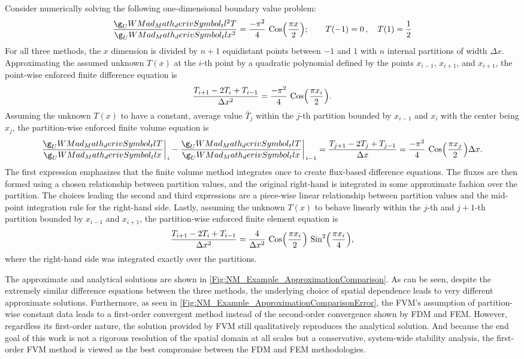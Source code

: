 \documentclass[12pt]{../UWMadThesis}
\begin{document}
Consider numerically solving the following one-dimensional boundary value problem:
\begin{equation}
    \deriv{T}{x}{2} = \frac{-\pi^2}{4}\,\Cos\left(\frac{\pi x}{2}\right);\quad\quad T(-1) = 0\,,\quad T(1) = \frac{1}{2}
    \label{Eqn:NM_Example_BVP}
\end{equation}
For all three methods, the $x$ dimension is divided by $n+1$ equidistant points between $-1$ and $1$ with $n$ internal partitions of width $\Delta{x}$.
Approximating the assumed unknown $T(x)$ at the $i$-th point by a quadratic polynomial defined by the points $x_{i-1}$, $x_{i+1}$, and $x_{i+1}$, the point-wise enforced finite difference equation is
\begin{equation}
    \frac{T_{i+1} - 2 T_i + T_{i-1}}{\Delta{x}^2} = \frac{-\pi^2}{4}\,\Cos\left(\frac{\pi x_i}{2}\right).
\end{equation}
Assuming the unknown $T(x)$ to have a constant, average value $\bar{T}_{j}$ within the $j$-th partition bounded by $x_{i-1}$ and $x_i$ with the center being $x_j$, the partition-wise enforced finite volume equation is
\begin{equation}
    \deriv{T}{x}\bigg\rvert_{i} - \deriv{T}{x}\bigg\rvert_{i-1} = 
    \frac{T_{j+1} - 2 T_j + T_{j-1}}{\Delta{x}} = \frac{-\pi^2}{4}\,\Cos\left(\frac{\pi x_j}{2}\right) \Delta{x}.
\end{equation}
The first expression emphasizes that the finite volume method integrates once to create flux-based difference equations.
The fluxes are then formed using a chosen relationship between partition values, and the original right-hand is integrated in some approximate fashion over the partition.  The choices leading the second and third expressions are a piece-wise linear relationship between partition values and the mid-point integration rule for the right-hand side.
Lastly, assuming the unknown $T(x)$ to behave linearly within the $j$-th and $j+1$-th partition bounded by $x_{i-1}$ and $x_{i+1}$, the partition-wise enforced finite element equation is
\begin{equation}
    \frac{T_{i+1} - 2 T_i + T_{i-1}}{\Delta{x}^2} = \frac{4}{\Delta{x}^2}\,\Cos\left(\frac{\pi x_i}{2}\right)\,\Sin^2\left(\frac{\pi x_i}{4}\right),
\end{equation}
where the right-hand side was integrated exactly over the partitions.

The approximate and analytical solutions are shown in \cref{Fig:NM_Example_ApproximationComparison}.
As can be seen, despite the extremely similar difference equations between the three methods, the underlying choice of spatial dependence leads to very different approximate solutions.
Furthermore, as seen in \cref{Fig:NM_Example_ApproximationComparisonError}, the FVM's assumption of partition-wise constant data leads to a first-order convergent method instead of the second-order convergence shown by FDM and FEM.
However, regardless its first-order nature, the solution provided by FVM still qualitatively reproduces the analytical solution.
And because the end goal of this work is not a rigorous resolution of the spatial domain at all scales but a conservative, system-wide stability analysis, the first-order FVM method is viewed as the best compromise between the FDM and FEM methodologies.
\end{document}
